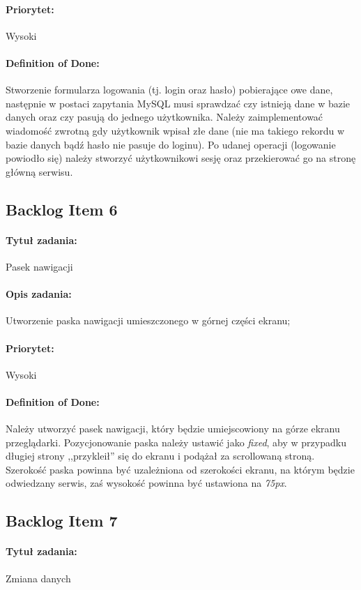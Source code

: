 \documentclass[a4paper]{article}
\begin{document}
	\paragraph{Priorytet:} Wysoki
	\paragraph{Definition of Done:} Stworzenie formularza logowania (tj. login oraz hasło) pobierające owe dane, następnie w postaci zapytania MySQL musi sprawdzać czy istnieją dane w bazie danych oraz czy pasują do jednego użytkownika. Należy zaimplementować wiadomość zwrotną gdy użytkownik wpisał złe dane (nie ma takiego rekordu w bazie danych bądź hasło nie pasuje do loginu). Po udanej operacji (logowanie powiodło się) należy stworzyć użytkownikowi sesję oraz przekierować go na stronę główną serwisu.
	
	\subsection{Backlog Item 6}
	\paragraph{Tytuł zadania:} Pasek nawigacji
	\paragraph{Opis zadania:} Utworzenie paska nawigacji umieszczonego w górnej części ekranu;
	\paragraph{Priorytet:} Wysoki
	\paragraph{Definition of Done:} Należy utworzyć pasek nawigacji, który będzie umiejscowiony na górze ekranu przeglądarki. Pozycjonowanie paska należy ustawić jako \emph{fixed}, aby w przypadku długiej strony ,,przykleił'' się do ekranu i podążał za scrollowaną stroną. Szerokość paska powinna być uzależniona od szerokości ekranu, na którym będzie odwiedzany serwis, zaś wysokość powinna być ustawiona na \emph{75px}.
	
	\subsection{Backlog Item 7}
	\paragraph{Tytuł zadania:} Zmiana danych
\end{document}
